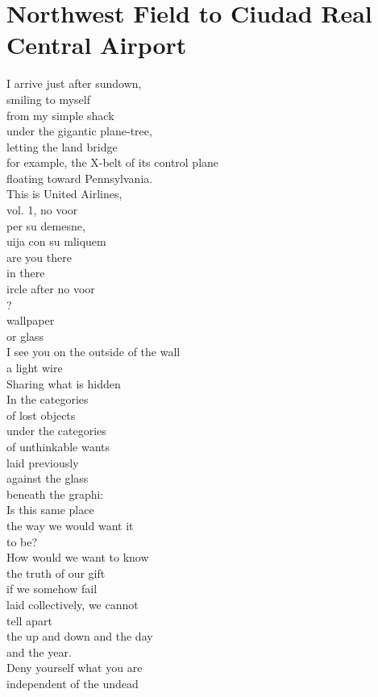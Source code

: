 \documentclass[smalldemyvopaper,11pt,twoside,onecolumn,openright,extrafontsizes]{memoir}
\begin{document}
\chapter{Northwest Field to Ciudad Real Central Airport}
I arrive just after sundown,
\\smiling to myself
\\from my simple shack
\\under the gigantic plane-tree,
\\letting the land bridge
\\for example, the X-belt of its control plane
\\floating toward Pennsylvania.
\\This is United Airlines,
\\vol. 1, no voor
\\per su demesne,
\\uija con su mliquem
\\are you there
\\in there
\\ircle after no voor
\\?
\\wallpaper
\\or glass
\\I see you on the outside of the wall
\\a light wire
\\Sharing what is hidden
\\In the categories
\\of lost objects
\\under the categories
\\of unthinkable wants
\\laid previously
\\against the glass
\\beneath the graphi:
\\Is this same place
\\the way we would want it
\\to be?
\\How would we want to know
\\the truth of our gift
\\if we somehow fail
\\laid collectively, we cannot
\\tell apart
\\the up and down and the day
\\and the year.
\\Deny yourself what you are
\\independent of the undead
\end{document}
